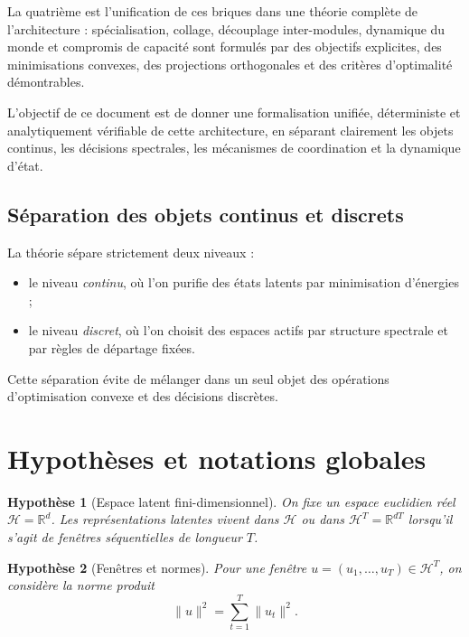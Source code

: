 \documentclass[11pt,a4paper]{article}
\newtheorem{assumption}{Hypothèse}[section]
\newcommand{\Hh}{\mathcal H}
\newcommand{\R}{\mathbb R}
\newcommand{\1}{\mathbf 1}
\begin{document}
La quatrième est l’unification de ces briques dans une théorie complète de l’architecture : spécialisation, collage, découplage inter-modules, dynamique du monde et compromis de capacité sont formulés par des objectifs explicites, des minimisations convexes, des projections orthogonales et des critères d’optimalité démontrables.

L’objectif de ce document est de donner une formalisation unifiée, déterministe et analytiquement vérifiable de cette architecture, en séparant clairement les objets continus, les décisions spectrales, les mécanismes de coordination et la dynamique d’état.

\subsection*{Séparation des objets continus et discrets}

La théorie sépare strictement deux niveaux :

\begin{itemize}[leftmargin=2em]
    \item le niveau \emph{continu}, où l'on purifie des états latents par minimisation d'énergies ;
    \item le niveau \emph{discret}, où l'on choisit des espaces actifs par structure spectrale et par règles de départage fixées.
\end{itemize}

Cette séparation évite de mélanger dans un seul objet des opérations d'optimisation convexe et des décisions discrètes.

\section{Hypothèses et notations globales}

\begin{assumption}[Espace latent fini-dimensionnel]
On fixe un espace euclidien réel \(\Hh=\R^d\).  
Les représentations latentes vivent dans \(\Hh\) ou dans \(\Hh^T=\R^{dT}\) lorsqu'il s'agit de fenêtres séquentielles de longueur \(T\).
\end{assumption}

\begin{assumption}[Fenêtres et normes]
Pour une fenêtre \(u=(u_1,\dots,u_T)\in \Hh^T\), on considère la norme produit
\[
\|u\|^2 = \sum_{t=1}^T \|u_t\|^2.
\]
\end{assumption}
\end{document}
